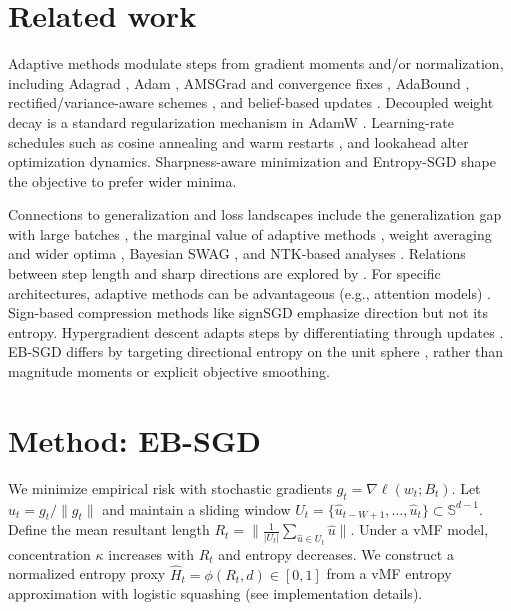 \section{Related work}
Adaptive methods modulate steps from gradient moments and/or normalization, including Adagrad \cite{Duchi2011AdagradJMLR}, Adam \cite{Kingma2015AdamICLR}, AMSGrad and convergence fixes \cite{Reddi2018AdamConvergenceICLR}, AdaBound \cite{Luo2019AdaBoundICLR}, rectified/variance-aware schemes \cite{Liu2020RAdamICLR}, and belief-based updates \cite{Zhuang2020AdaBeliefNeurIPS}. Decoupled weight decay is a standard regularization mechanism in AdamW \cite{Loshchilov2019AdamWICLR}. Learning-rate schedules such as cosine annealing and warm restarts \cite{Loshchilov2017SGDRICLR}, and lookahead \cite{Zhang2019LookaheadNeurIPS} alter optimization dynamics. Sharpness-aware minimization \cite{Foret2021SAMICLR} and Entropy-SGD \cite{Chaudhari2019EntropySGDJSTAT} shape the objective to prefer wider minima.

Connections to generalization and loss landscapes include the generalization gap with large batches \cite{Keskar2017LargeBatchICLR}, the marginal value of adaptive methods \cite{Wilson2017MarginalValueNeurIPS}, weight averaging and wider optima \cite{Izmailov2018SWAUAI}, Bayesian SWAG \cite{Maddox2019SWAGNeurIPS}, and NTK-based analyses \cite{Jacot2018NTKNeurIPS}. Relations between step length and sharp directions are explored by \cite{Jastrzebski2018SharpestSGD}. For specific architectures, adaptive methods can be advantageous (e.g., attention models) \cite{Zhang2019WhyAdamAttention}. Sign-based compression methods like signSGD \cite{Bernstein2018signSGDICML} emphasize direction but not its entropy. Hypergradient descent adapts steps by differentiating through updates \cite{Baydin2018HypergradientICLR}. EB-SGD differs by targeting directional entropy on the unit sphere \cite{MardiaJupp2000Directional,Banerjee2005vMFJMLR}, rather than magnitude moments or explicit objective smoothing.

\section{Method: EB-SGD}
We minimize empirical risk with stochastic gradients $g_t=\nabla \ell(w_t;B_t)$. Let $\hat{u}_t=g_t/\|g_t\|$ and maintain a sliding window $U_t=\{\hat{u}_{t-W+1},\dots,\hat{u}_t\}\subset\mathbb{S}^{d-1}$. Define the mean resultant length
$
R_t=\Big\|\frac{1}{|U_t|}\sum_{\hat{u}\in U_t}\hat{u}\Big\|.
$
Under a vMF model, concentration $\kappa$ increases with $R_t$ and entropy decreases. We construct a normalized entropy proxy $\widehat{H}_t=\phi(R_t,d)\in[0,1]$ from a vMF entropy approximation with logistic squashing (see implementation details).


